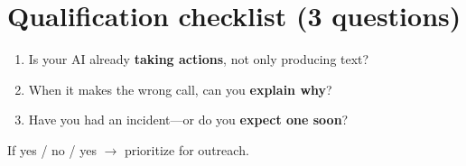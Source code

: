 \section{Qualification checklist (3 questions)}

\begin{enumerate}
  \item Is your AI already \textbf{taking actions}, not only producing text?
  \item When it makes the wrong call, can you \textbf{explain why}?
  \item Have you had an incident---or do you \textbf{expect one soon}?
\end{enumerate}

If yes / no / yes $\rightarrow$ prioritize for outreach.
